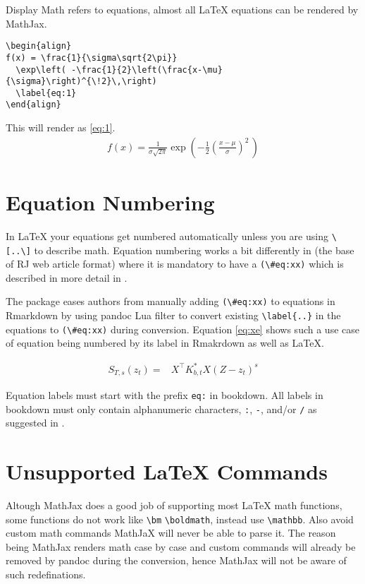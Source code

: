 Display Math refers to equations, almost all LaTeX equations can be rendered by
MathJax.

\begin{verbatim}
\begin{align}
f(x) = \frac{1}{\sigma\sqrt{2\pi}} 
  \exp\left( -\frac{1}{2}\left(\frac{x-\mu}{\sigma}\right)^{\!2}\,\right)
  \label{eq:1}
\end{align}
\end{verbatim}
This will render as \ref{eq:1}.
\begin{align}
f(x) = \frac{1}{\sigma\sqrt{2\pi}} 
  \exp\left( -\frac{1}{2}\left(\frac{x-\mu}{\sigma}\right)^{\!2}\,\right)
  \label{eq:1}
\end{align}

\section{Equation Numbering}
In LaTeX your equations get numbered automatically unless you are using \verb|\[..\]| to describe
math. Equation numbering works a bit differently in  (the base of RJ web article format) where
it is mandatory to have a \verb|(\#eq:xx)| which is described in more detail in \citep{bookdown}.

The  package eases authors from manually adding \verb|(\#eq:xx)| to equations in Rmarkdown
by using pandoc Lua filter to convert existing \verb|\label{..}| in the equations to \verb|(\#eq:xx)|
during conversion. Equation \ref{eq:xe} shows such a use case of equation being numbered by its label in Rmakrdown
as well as LaTeX.

\begin{align}
S_{T, s}(z_t) = & X^{\top} K_{b,t}^* X (Z - z_t)^s 
\label{eq:xe}
\end{align}

Equation labels must start with the prefix \verb|eq:| in bookdown. All labels in bookdown must only contain alphanumeric characters, \verb|:|, \verb|-|, and/or \verb|/| as suggested in \citep{bookdown}. 


\section{Unsupported LaTeX Commands}

Altough MathJax does a good job of supporting most LaTeX math functions,
some functions do not work like \verb|\bm| \verb|\boldmath|, instead use \verb|\mathbb|.
Also avoid custom math commands MathJaX will never be able to parse it. The reason being
MathJax renders math case by case and custom commands will already be removed by pandoc
during the conversion, hence MathJax will not be aware of such redefinations.


